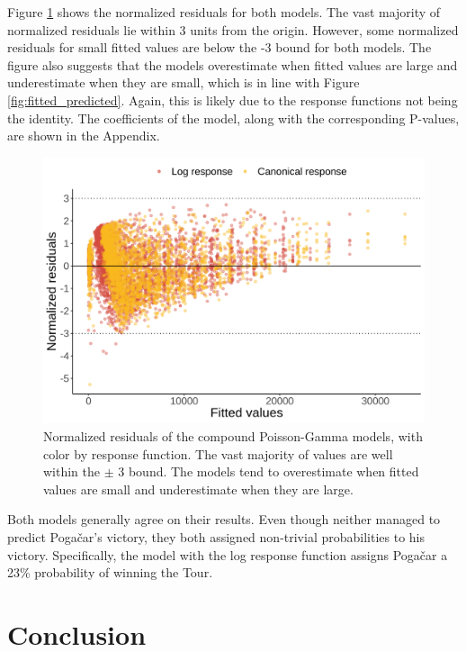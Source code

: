 \documentclass[aos,preprint]{imsart}
\begin{document}
Figure \ref{fig:norm_res} shows the normalized residuals for both models. The vast majority of normalized residuals lie within 3 units from the origin. However, some normalized residuals for small fitted values are below the -3 bound for both models. The figure also suggests that the models overestimate when fitted values are large and underestimate when they are small, which is in line with Figure \ref{fig:fitted_predicted}. Again, this is likely due to the response functions not being the identity. The coefficients of the  model, along with the corresponding P-values, are shown in the Appendix. \\




\begin{figure}[h]
  \centering
  \includegraphics[scale=0.65]{fig/norm_res_comparison.png}
  \caption{Normalized residuals of the compound Poisson-Gamma models, with color by response function. The vast majority of values are well within the $\pm$ 3 bound. The models tend to overestimate when fitted values are small and underestimate when they are large.}
  \label{fig:norm_res}
\end{figure}


Both models generally agree on their results. Even though neither managed to predict Pogačar's victory, they both assigned non-trivial probabilities to his victory. Specifically, the model with the log response function assigns Pogačar a 23\% probability of winning the Tour.




\section{Conclusion} \label{sec:conclusion}
\end{document}
